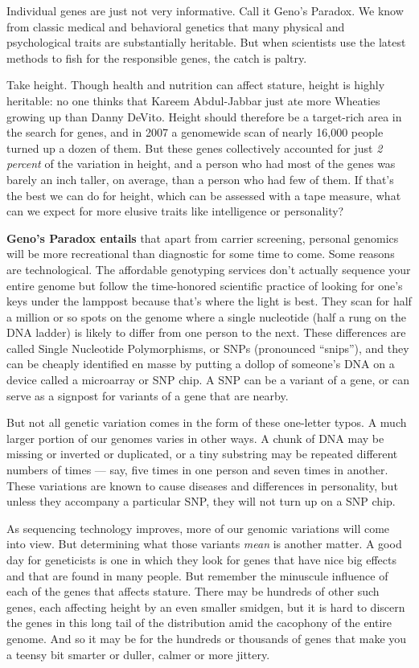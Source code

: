 Individual genes are just not very informative. Call it Geno's Paradox.
We know from classic medical and behavioral genetics that many physical
and psychological traits are substantially heritable. But when
scientists use the latest methods to fish for the responsible genes, the
catch is paltry.

Take height. Though health and nutrition can affect stature, height is
highly heritable: no one thinks that Kareem Abdul-Jabbar just ate more
Wheaties growing up than Danny DeVito. Height should therefore be a
target-rich area in the search for genes, and in 2007 a genomewide scan
of nearly 16,000 people turned up a dozen of them. But these genes
collectively accounted for just \emph{2 percent} of the variation in
height, and a person who had most of the genes was barely an inch
taller, on average, than a person who had few of them. If that's the
best we can do for height, which can be assessed with a tape measure,
what can we expect for more elusive traits like intelligence or
personality?

\textbf{Geno's Paradox entails} that apart from carrier screening,
personal genomics will be more recreational than diagnostic for some
time to come. Some reasons are technological. The affordable genotyping
services don't actually sequence your entire genome but follow the
time-honored scientific practice of looking for one's keys under the
lamppost because that's where the light is best. They scan for half a
million or so spots on the genome where a single nucleotide (half a rung
on the DNA ladder) is likely to differ from one person to the next.
These differences are called Single Nucleotide Polymorphisms, or SNPs
(pronounced ``snips''), and they can be cheaply identified en masse by
putting a dollop of someone's DNA on a device called a microarray or SNP
chip. A SNP can be a variant of a gene, or can serve as a signpost for
variants of a gene that are nearby.

But not all genetic variation comes in the form of these one-letter
typos. A much larger portion of our genomes varies in other ways. A
chunk of DNA may be missing or inverted or duplicated, or a tiny
substring may be repeated different numbers of times --- say, five times
in one person and seven times in another. These variations are known to
cause diseases and differences in personality, but unless they accompany
a particular SNP, they will not turn up on a SNP chip.

As sequencing technology improves, more of our genomic variations will
come into view. But determining what those variants \emph{mean} is
another matter. A good day for geneticists is one in which they look for
genes that have nice big effects and that are found in many people. But
remember the minuscule influence of each of the genes that affects
stature. There may be hundreds of other such genes, each affecting
height by an even smaller smidgen, but it is hard to discern the genes
in this long tail of the distribution amid the cacophony of the entire
genome. And so it may be for the hundreds or thousands of genes that
make you a teensy bit smarter or duller, calmer or more jittery.

